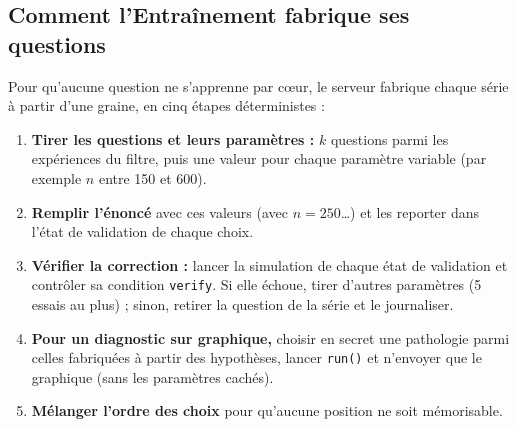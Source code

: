 \documentclass[11pt,a4paper]{article}
\begin{document}
\subsection{Comment l'Entraînement fabrique ses questions}\label{sec:fabrique}
Pour qu'aucune question ne s'apprenne par cœur, le serveur fabrique chaque série à partir d'une graine, en cinq étapes déterministes :
\begin{enumerate}[leftmargin=*, nosep]
  \item \textbf{Tirer les questions et leurs paramètres :} $k$ questions parmi les expériences du filtre, puis une valeur pour chaque paramètre variable (par exemple $n$ entre 150 et 600).
  \item \textbf{Remplir l'énoncé} avec ces valeurs (\og avec $n = 250$\dots \fg{}) et les reporter dans l'état de validation de chaque choix.
  \item \textbf{Vérifier la correction :} lancer la simulation de chaque état de validation et contrôler sa condition \texttt{verify}. Si elle échoue, tirer d'autres paramètres (5 essais au plus) ; sinon, retirer la question de la série et le journaliser.
  \item \textbf{Pour un diagnostic sur graphique,} choisir en secret une pathologie parmi celles fabriquées à partir des hypothèses, lancer \texttt{run()} et n'envoyer que le graphique (sans les paramètres cachés).
  \item \textbf{Mélanger l'ordre des choix} pour qu'aucune position ne soit mémorisable.
\end{enumerate}
\end{document}

